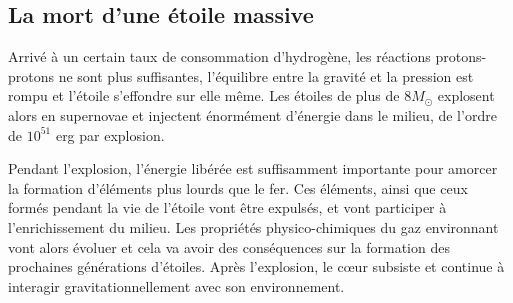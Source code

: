 \subsection{La mort d'une étoile massive}
\label{sec:snmort}

Arrivé à un certain taux de consommation d'hydrogène, les réactions protons-protons ne sont plus suffisantes, l'équilibre entre la gravité et la pression est rompu et l'étoile s'effondre sur elle même.
Les étoiles de plus de $8 M_\odot$ explosent alors en supernovae et injectent énormément d'énergie dans le milieu, de l'ordre de $10^{51}$ erg par explosion. 


Pendant l'explosion, l'énergie libérée est suffisamment importante pour amorcer la formation d'éléments plus lourds que le fer.
Ces éléments, ainsi que ceux formés pendant la vie de l'étoile vont être expulsés, et vont participer à l'enrichissement du milieu.
Les propriétés physico-chimiques du gaz environnant vont alors évoluer et cela va avoir des conséquences sur la formation des prochaines générations d'étoiles.
Après l'explosion, le cœur subsiste et continue à interagir gravitationnellement avec son environnement.

